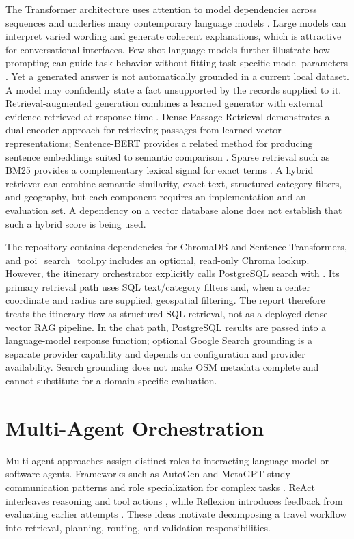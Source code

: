 The Transformer architecture uses attention to model dependencies across sequences and underlies many contemporary language models \cite{vaswani2017attention}. Large models can interpret varied wording and generate coherent explanations, which is attractive for conversational interfaces. Few-shot language models further illustrate how prompting can guide task behavior without fitting task-specific model parameters \cite{brown2020language}. Yet a generated answer is not automatically grounded in a current local dataset. A model may confidently state a fact unsupported by the records supplied to it.
Retrieval-augmented generation combines a learned generator with external evidence retrieved at response time \cite{lewis2020retrieval}. Dense Passage Retrieval demonstrates a dual-encoder approach for retrieving passages from learned vector representations; Sentence-BERT provides a related method for producing sentence embeddings suited to semantic comparison \cite{karpukhin2020dense,reimers2019sentence}. Sparse retrieval such as BM25 provides a complementary lexical signal for exact terms \cite{robertson2009probabilistic}. A hybrid retriever can combine semantic similarity, exact text, structured category filters, and geography, but each component requires an implementation and an evaluation set. A dependency on a vector database alone does not establish that such a hybrid score is being used.

The repository contains dependencies for ChromaDB and Sentence-Transformers, and \url{poi_search_tool.py} includes an optional, read-only Chroma lookup. However, the itinerary orchestrator explicitly calls PostgreSQL search with . Its primary retrieval path uses SQL text/category filters and, when a center coordinate and radius are supplied, geospatial filtering. The report therefore treats the itinerary flow as structured SQL retrieval, not as a deployed dense-vector RAG pipeline. In the chat path, PostgreSQL results are passed into a language-model response function; optional Google Search grounding is a separate provider capability and depends on configuration and provider availability. Search grounding does not make OSM metadata complete and cannot substitute for a domain-specific evaluation.

\section{Multi-Agent Orchestration}

Multi-agent approaches assign distinct roles to interacting language-model or software agents. Frameworks such as AutoGen and MetaGPT study communication patterns and role specialization for complex tasks \cite{wu2023autogen,hong2023metagpt}. ReAct interleaves reasoning and tool actions \cite{yao2023react}, while Reflexion introduces feedback from evaluating earlier attempts \cite{shinn2023reflexion}. These ideas motivate decomposing a travel workflow into retrieval, planning, routing, and validation responsibilities.

